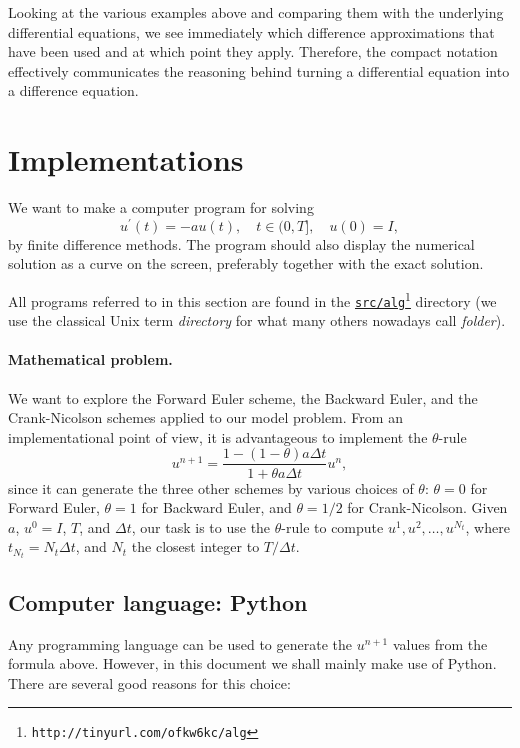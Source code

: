 \documentclass[graybox,sectrefs,envcountresetchap,open=right,final]{svmonodo}
\begin{document}
Looking at the various examples above and comparing them with the
underlying differential equations, we see immediately which difference
approximations that have been used and at which point they
apply. Therefore, the compact notation effectively communicates the
reasoning behind turning a differential equation into a difference
equation.


\section{Implementations}
\label{decay:impl1}

We want to make a computer program for solving
\[
u^{\prime}(t) = -au(t),\quad t\in (0,T], \quad u(0)=I,
\]
by finite difference methods. The program should also display
the numerical solution as a curve on the
screen, preferably together with the
exact solution.

 

All programs referred to in this section are found in the
\href{{http://tinyurl.com/ofkw6kc/alg}}{\nolinkurl{src/alg}\footnote{\texttt{http://tinyurl.com/ofkw6kc/alg}}} directory (we use the classical
Unix term \emph{directory} for what many others nowadays call \emph{folder}).

\paragraph{Mathematical problem.}
We want to explore the Forward Euler scheme, the
Backward Euler, and the Crank-Nicolson schemes applied to our model problem.
From an implementational point of view, it is advantageous to
implement the $\theta$-rule
\[
u^{n+1} = \frac{1 - (1-\theta) a\Delta t}{1 + \theta a\Delta t}u^n,
\]
since it can generate the three other schemes by various
choices of $\theta$: $\theta=0$ for Forward Euler, $\theta =1$ for
Backward Euler, and $\theta =1/2$ for Crank-Nicolson.
Given $a$, $u^0=I$, $T$, and $\Delta t$,
our task is to use the $\theta$-rule to
compute $u^1, u^2,\ldots,u^{N_t}$, where $t_{N_t}=N_t\Delta t$, and
$N_t$ the closest integer to $T/\Delta t$.

\subsection{Computer language: Python}

Any programming language can be used to generate the $u^{n+1}$ values from
the formula above. However, in this document we shall mainly make use of
Python. There are several good reasons for this choice:
\end{document}
